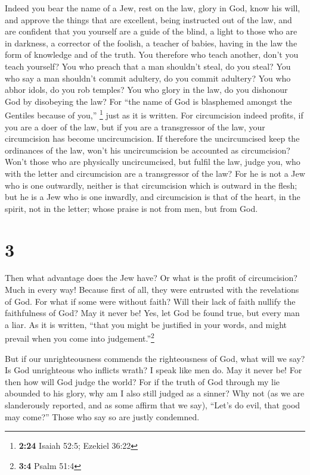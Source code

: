  Indeed you bear the name of a Jew, rest on the law,
glory in God,  know his will, and approve the things that
are excellent, being instructed out of the law,  and are
confident that you yourself are a guide of the blind, a light to those
who are in darkness,  a corrector of the foolish, a
teacher of babies, having in the law the form of knowledge and of the
truth.  You therefore who teach another, don't you teach
yourself? You who preach that a man shouldn't steal, do you steal?
 You who say a man shouldn't commit adultery, do you
commit adultery? You who abhor idols, do you rob temples?
 You who glory in the law, do you dishonour God by
disobeying the law?  For ``the name of God is blasphemed
amongst the Gentiles because of you,'' \footnote{\textbf{2:24} Isaiah
  52:5; Ezekiel 36:22} just as it is written.  For
circumcision indeed profits, if you are a doer of the law, but if you
are a transgressor of the law, your circumcision has become
uncircumcision.  If therefore the uncircumcised keep the
ordinances of the law, won't his uncircumcision be accounted as
circumcision?  Won't those who are physically
uncircumcised, but fulfil the law, judge you, who with the letter and
circumcision are a transgressor of the law?  For he is
not a Jew who is one outwardly, neither is that circumcision which is
outward in the flesh;  but he is a Jew who is one
inwardly, and circumcision is that of the heart, in the spirit, not in
the letter; whose praise is not from men, but from God.

\hypertarget{section-2}{%
\section{3}\label{section-2}}

 Then what advantage does the Jew have? Or what is the
profit of circumcision?  Much in every way! Because first
of all, they were entrusted with the revelations of God. 
For what if some were without faith? Will their lack of faith nullify
the faithfulness of God?  May it never be! Yes, let God be
found true, but every man a liar. As it is written, ``that you might be
justified in your words, and might prevail when you come into
judgement.''\footnote{\textbf{3:4} Psalm 51:4}

 But if our unrighteousness commends the righteousness of
God, what will we say? Is God unrighteous who inflicts wrath? I speak
like men do.  May it never be! For then how will God judge
the world?  For if the truth of God through my lie
abounded to his glory, why am I also still judged as a sinner?
 Why not (as we are slanderously reported, and as some
affirm that we say), ``Let's do evil, that good may come?'' Those who
say so are justly condemned.

